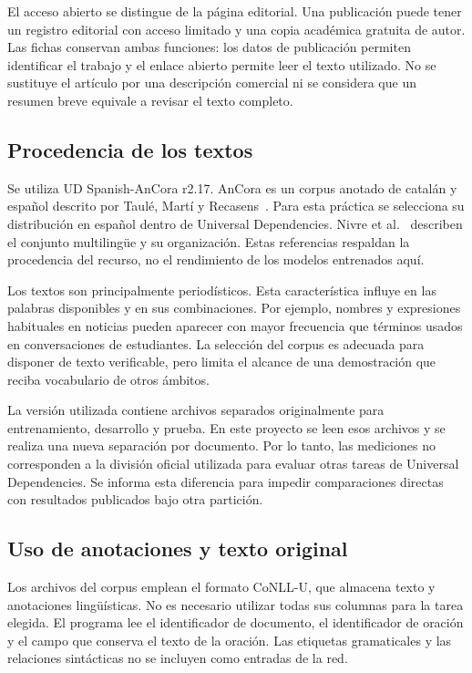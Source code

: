 El acceso abierto se distingue de la página editorial. Una publicación puede tener un registro editorial con acceso limitado y una copia académica gratuita de autor. Las fichas conservan ambas funciones: los datos de publicación permiten identificar el trabajo y el enlace abierto permite leer el texto utilizado. No se sustituye el artículo por una descripción comercial ni se considera que un resumen breve equivale a revisar el texto completo.

\subsection{Procedencia de los textos}
Se utiliza UD Spanish-AnCora r2.17. AnCora es un corpus anotado de catalán y español descrito por Taulé, Martí y Recasens~\cite{taule2008}. Para esta práctica se selecciona su distribución en español dentro de Universal Dependencies. Nivre et al.~\cite{nivre2020} describen el conjunto multilingüe y su organización. Estas referencias respaldan la procedencia del recurso, no el rendimiento de los modelos entrenados aquí.

Los textos son principalmente periodísticos. Esta característica influye en las palabras disponibles y en sus combinaciones. Por ejemplo, nombres y expresiones habituales en noticias pueden aparecer con mayor frecuencia que términos usados en conversaciones de estudiantes. La selección del corpus es adecuada para disponer de texto verificable, pero limita el alcance de una demostración que reciba vocabulario de otros ámbitos.

La versión utilizada contiene archivos separados originalmente para entrenamiento, desarrollo y prueba. En este proyecto se leen esos archivos y se realiza una nueva separación por documento. Por lo tanto, las mediciones no corresponden a la división oficial utilizada para evaluar otras tareas de Universal Dependencies. Se informa esta diferencia para impedir comparaciones directas con resultados publicados bajo otra partición.

\subsection{Uso de anotaciones y texto original}
Los archivos del corpus emplean el formato CoNLL-U, que almacena texto y anotaciones lingüísticas. No es necesario utilizar todas sus columnas para la tarea elegida. El programa lee el identificador de documento, el identificador de oración y el campo que conserva el texto de la oración. Las etiquetas gramaticales y las relaciones sintácticas no se incluyen como entradas de la red.

